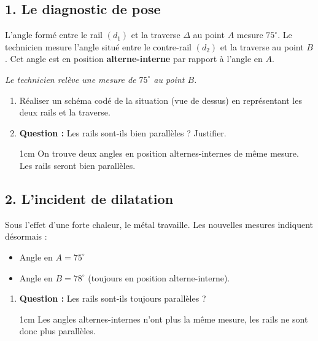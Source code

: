 \documentclass[a4paper]{book}
\begin{document}
{\begin{exercice}
        \subsection*{1. Le diagnostic de pose}
        L'angle formé entre le rail $(d_1)$ et la traverse $\Delta$ au point $A$ mesure $75^\circ$. Le technicien mesure l'angle situé entre le contre-rail $(d_2)$ et la traverse au point $B$. Cet angle est en position \textbf{alterne-interne} par rapport à l'angle en $A$.
        
        \textit{Le technicien relève une mesure de $75^\circ$ au point $B$.}
        
        \begin{enumerate}
            \item Réaliser un schéma codé de la situation (vue de dessus) en représentant les deux rails et la traverse.
            \item \textbf{Question :} Les rails sont-ils bien parallèles ? Justifier.

            \begin{ZoneReponse}{1cm}
                On trouve deux angles en position alternes-internes de même mesure. Les rails seront bien parallèles.
            \end{ZoneReponse}
        \end{enumerate}
        
        \subsection*{2. L'incident de dilatation}
        Sous l'effet d'une forte chaleur, le métal travaille. Les nouvelles mesures indiquent désormais :
        \begin{itemize}
            \item Angle en $A = 75^\circ$
            \item Angle en $B = 78^\circ$ (toujours en position alterne-interne).
        \end{itemize}
        
        \begin{enumerate}
            \item \textbf{Question :} Les rails sont-ils toujours parallèles ? 
            
            \begin{ZoneReponse}{1cm}
                Les angles alternes-internes n'ont plus la même mesure, les rails ne sont donc plus parallèles.
            \end{ZoneReponse}
            

\end{enumerate}
\end{exercice}}
\end{document}
